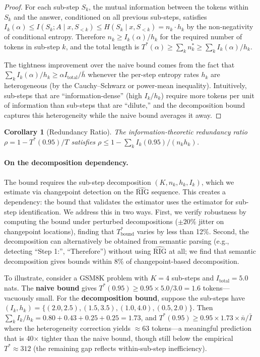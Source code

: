 \documentclass{article}
\newtheorem{corollary}[theorem]{Corollary}
\newcommand{\RIG}{\mathrm{RIG}}
\newcommand{\Itotal}{I_{\mathrm{total}}}
\begin{document}
\begin{proof}
For each sub-step $S_k$, the mutual information between the tokens within $S_k$ and the answer, conditioned on all previous sub-steps, satisfies $I_k(\alpha) \leq I(S_k; A \mid x, S_{<k}) \leq H(S_k \mid x, S_{<k}) = n_k \cdot h_k$ by the non-negativity of conditional entropy. Therefore $n_k \geq I_k(\alpha)/h_k$ for the required number of tokens in sub-step $k$, and the total length is $T^*(\alpha) \geq \sum_k n_k^* \geq \sum_k I_k(\alpha)/h_k$.

The tightness improvement over the naive bound comes from the fact that $\sum_k I_k(\alpha)/h_k \geq \alpha \Itotal / \bar{h}$ whenever the per-step entropy rates $h_k$ are heterogeneous (by the Cauchy--Schwarz or power-mean inequality). Intuitively, sub-steps that are ``information-dense'' (high $I_k/h_k$) require more tokens per unit of information than sub-steps that are ``dilute,'' and the decomposition bound captures this heterogeneity while the naive bound averages it away.
\end{proof}

\begin{corollary}[Redundancy Ratio]
\label{cor:redundancy}
The information-theoretic redundancy ratio $\rho = 1 - T^*(0.95)/T$ satisfies $\rho \leq 1 - \sum_k I_k(0.95)/(n_k h_k)$.
\end{corollary}

\paragraph{On the decomposition dependency.} The bound requires the sub-step decomposition $(K, n_k, h_k, I_k)$, which we estimate via changepoint detection on the $\widehat{\RIG}$ sequence. This creates a dependency: the bound that validates the estimator uses the estimator for sub-step identification. We address this in two ways. First, we verify robustness by computing the bound under perturbed decompositions ($\pm 20\%$ jitter on changepoint locations), finding that $T^*_{\text{bound}}$ varies by less than 12\%. Second, the decomposition can alternatively be obtained from semantic parsing (e.g., detecting ``Step 1:'', ``Therefore'') without using $\widehat{\RIG}$ at all; we find that semantic decomposition gives bounds within 8\% of changepoint-based decomposition.

To illustrate, consider a GSM8K problem with $K{=}4$ sub-steps and $\Itotal = 5.0$ nats. The \textbf{naive bound} gives $T^*(0.95) \geq 0.95 \times 5.0 / 3.0 = 1.6$ tokens---vacuously small. For the \textbf{decomposition bound}, suppose the sub-steps have $(I_k, h_k) = \{(2.0, 2.5), (1.5, 3.5), (1.0, 4.0), (0.5, 2.0)\}$. Then $\sum_k I_k / h_k = 0.80 + 0.43 + 0.25 + 0.25 = 1.73$, and $T^*(0.95) \geq 0.95 \times 1.73 \times \bar{n} / \bar{I}$ where the heterogeneity correction yields $\approx 63$ tokens---a meaningful prediction that is 40$\times$ tighter than the naive bound, though still below the empirical $T^* \approx 312$ (the remaining gap reflects within-sub-step inefficiency).
\end{document}
